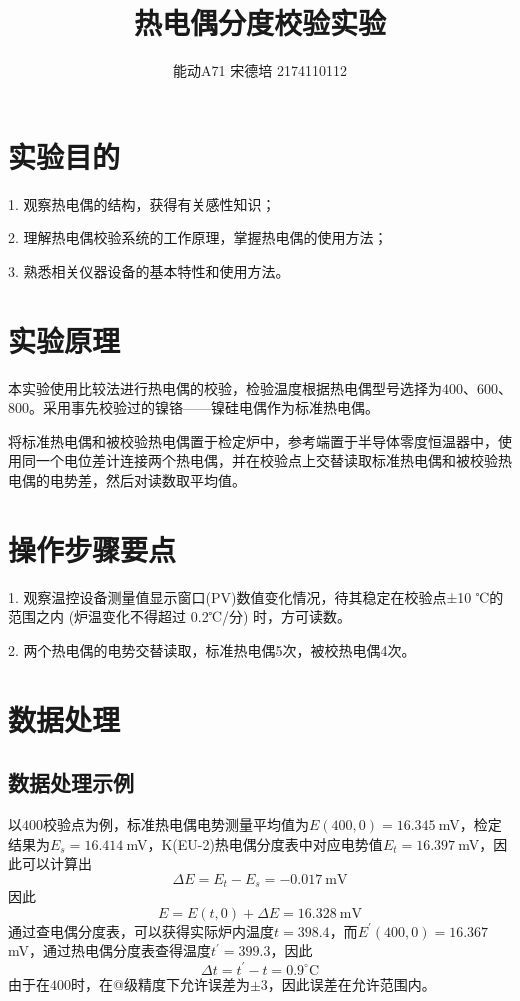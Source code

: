 \documentclass[UTF8]{article}
\title{热电偶分度校验实验}
\author{能动A71 宋德培 2174110112}
\makeatletter
\newcommand{\Rmnum}[1]{\expandafter\@slowromancap\romannumeral #1@}
\makeatother
\begin{document}
	\maketitle
	\section{实验目的}
	1.	观察热电偶的结构，获得有关感性知识；
	
	2.	理解热电偶校验系统的工作原理，掌握热电偶的使用方法；
	
	3.	熟悉相关仪器设备的基本特性和使用方法。
	
	\section{实验原理}
	本实验使用比较法进行热电偶的校验，检验温度根据热电偶型号选择为$400$\textcelsius、600\textcelsius、800\textcelsius。采用事先校验过的镍铬——镍硅电偶作为标准热电偶。
	
	将标准热电偶和被校验热电偶置于检定炉中，参考端置于半导体零度恒温器中，使用同一个电位差计连接两个热电偶，并在校验点上交替读取标准热电偶和被校验热电偶的电势差，然后对读数取平均值。
	
	\section{操作步骤要点}
	1. 观察温控设备测量值显示窗口(PV)数值变化情况，待其稳定在校验点±10 ℃的范围之内 (炉温变化不得超过 0.2℃/分) 时，方可读数。
	
	2. 两个热电偶的电势交替读取，标准热电偶5次，被校热电偶4次。
	\section{数据处理}
	\subsection{数据处理示例}
	以$400$\textcelsius 校验点为例，标准热电偶电势测量平均值为$E(400,0) = 16.345\ $mV，检定结果为$E_s = 16.414\ $mV，K(EU-2)热电偶分度表中对应电势值$E_t = 16.397\ $mV，因此可以计算出
	\[
	\Delta E = E_t-E_s = -0.017 \ \mathrm{mV}
	\]
	因此
	\[
	E = E(t,0) +\Delta E = 16.328\ \mathrm{mV}
	\]
	通过查电偶分度表，可以获得实际炉内温度$t = 398.4$\textcelsius，而$E^{'}(400,0) = 16.367\ $mV，通过热电偶分度表查得温度$t^{'} = 399.3$\textcelsius，因此
	\[
	\Delta t = t^{'} - t = 0.9 ^\circ \mathrm{C}
	\]
	由于在$400$\textcelsius 时，在\Rmnum{2}级精度下允许误差为$\pm 3$\textcelsius，因此误差在允许范围内。
	
\end{document}
